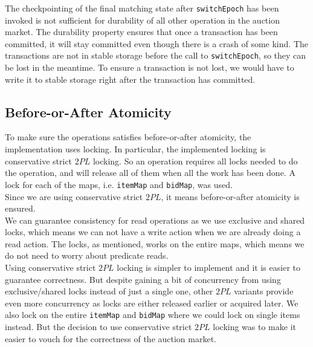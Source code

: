 \documentclass[a4paper]{article}
\begin{document}
The checkpointing of the final matching state after \texttt{switchEpoch} has been invoked is not sufficient for durability of all other operation in the auction market. The durability property ensures that once a transaction has been committed, it will stay committed even though there is a crash of some kind. The transactions are not in stable storage before the call to \texttt{switchEpoch}, so they can be lost in the meantime. To ensure a transaction is not lost, we would have to write it to stable storage right after the transaction has committed.

\subsection{Before-or-After Atomicity}
To make sure the operations satisfies before-or-after atomicity, the implementation uses locking. In particular, the implemented locking is conservative strict $2PL$ locking. So an operation requires all locks needed to do the operation, and will release all of them when all the work has been done. A lock for each of the maps, i.e. \texttt{itemMap} and \texttt{bidMap}, was used. \\
Since we are using conservative strict $2PL$, it means before-or-after atomicity is ensured. \\
We can guarantee consistency for read operations as we use exclusive and shared locks, which means we can not have a write action when we are already doing a read action. The locks, as mentioned, works on the entire maps, which means we do not need to worry about predicate reads. \\
Using conservative strict $2PL$ locking is simpler to implement and it is easier to guarantee correctness. But despite gaining a bit of concurrency from using exclusive/shared locks instead of just a single one, other $2PL$ variants provide even more concurrency as locks are either released earlier or acquired later. We also lock on the entire \texttt{itemMap} and \texttt{bidMap} where we could lock on single items instead. But the decision to use conservative strict $2PL$ locking was to make it easier to vouch for the correctness of the auction market.
\end{document}
